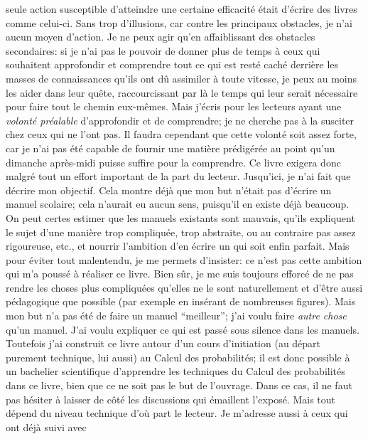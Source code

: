 seule action susceptible d'atteindre une certaine efficacit\'e \'etait 
d'\'ecrire des livres comme celui-ci. Sans trop d'illusions, car contre  
les principaux obstacles, je n'ai aucun moyen d'action. Je ne peux  
agir qu'en affaiblissant des obstacles secondaires:  si je n'ai pas le 
pouvoir de donner plus de temps \`a ceux qui souhaitent approfondir et 
comprendre tout ce qui est rest\'e cach\'e derri\`ere les masses de 
connaissances qu'ils ont  d\^u assimiler \`a toute vitesse, je peux au 
moins les aider dans leur qu\^ete, raccourcissant par l\`a le temps qui 
leur serait n\'ecessaire pour  faire tout le chemin eux-m\^emes. Mais 
j'\'ecris pour les lecteurs ayant une {\it volont\'e pr\'ealable} 
d'approfondir et de comprendre; je ne cherche pas \`a la susciter chez 
ceux qui ne l'ont pas.    
\medskip 
Il faudra cependant que cette volont\'e soit assez forte, car je n'ai pas 
\'et\'e capable de fournir une mati\`ere pr\'edig\'er\'ee au point qu'un  
dimanche apr\`es-midi puisse suffire pour la comprendre. 
Ce  livre exigera donc malgr\'e tout un effort important de la 
part du lecteur.  
\medskip 
Jusqu'ici, je n'ai fait que d\'ecrire mon objectif. Cela montre d\'ej\`a  
que mon but n'\'etait pas d'\'ecrire un manuel scolaire; cela n'aurait eu 
aucun sens, puisqu'il en existe d\'ej\`a beaucoup. On peut certes  
estimer que les manuels existants sont mauvais, qu'ils expliquent le 
sujet d'une mani\`ere trop compliqu\'ee, trop abstraite, ou au contraire  
pas assez rigoureuse, etc., et nourrir l'ambition d'en \'ecrire un qui 
soit enfin parfait. Mais pour \'eviter tout malentendu, je me permets 
d'insister: ce n'est pas cette ambition qui m'a pouss\'e \`a r\'ealiser ce 
livre. Bien s\^ur, je me suis toujours efforc\'e de ne pas rendre les 
choses plus compliqu\'ees qu'elles  ne le sont naturellement et d'\^etre 
aussi p\'edagogique que possible (par exemple en ins\'erant de 
nombreuses figures). Mais mon but n'a pas  \'et\'e de faire un manuel 
``meilleur''; j'ai voulu faire {\it autre chose}  qu'un manuel. J'ai voulu 
expliquer ce qui est pass\'e sous silence dans les manuels. Toutefois j'ai 
construit ce livre autour d'un cours d'initiation  (au d\'epart purement 
technique, lui aussi) au Calcul des probabilit\'es;  il est donc possible  
\`a un bachelier scientifique d'apprendre les techniques du Calcul des 
probabilit\'es dans ce livre, bien que ce ne soit pas le but de l'ouvrage. 
Dans ce cas, il ne faut pas h\'esiter \`a laisser de c\^ot\'e les discussions 
qui \'emaillent l'expos\'e. Mais tout d\'epend du niveau technique d'o\`u 
part le lecteur. Je m'adresse aussi \`a ceux qui  ont d\'ej\`a suivi avec 
